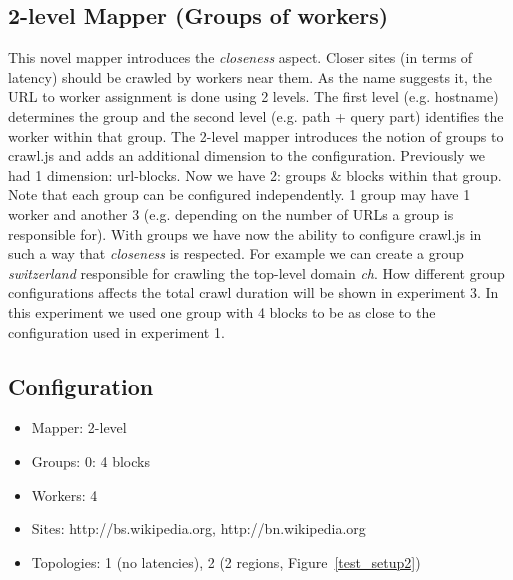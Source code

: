 \subsection{2-level Mapper (Groups of workers)}
This novel mapper introduces the \emph{closeness} aspect. Closer sites (in terms of latency) should be crawled by workers near them. 
\newline
As the name suggests it, the URL to worker assignment is done using 2 levels. The first level (e.g. hostname) determines the group and the second level (e.g. path + query part) identifies the worker within that group. The 2-level mapper introduces the notion of groups to crawl.js and adds an additional dimension to the configuration. Previously we had 1 dimension: url-blocks. Now we have 2: groups \& blocks within that group. Note that each group can be configured independently. 1 group may have 1 worker and another 3 (e.g. depending on the number of URLs a group is responsible for).
\newline
With groups we have now the ability to configure crawl.js in such a way that \emph{closeness} is respected. For example we can create a group \emph{switzerland} responsible for crawling the top-level domain \emph{ch}. How different group configurations affects the total crawl duration will be shown in experiment 3.
\newline
In this experiment we used one group with 4 blocks to be as close to the configuration used in experiment 1.

\subsection{Configuration}
\begin{itemize}
  \item Mapper: 2-level
  \item Groups: 0: 4 blocks
  \item Workers: 4
  \item Sites: http://bs.wikipedia.org, http://bn.wikipedia.org
  \item Topologies: 1 (no latencies), 2 (2 regions, Figure~\ref{test_setup2})
\end{itemize}


